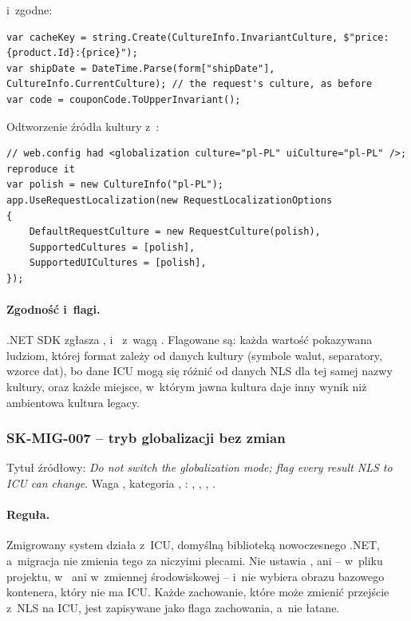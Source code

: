 i~zgodne:

\begin{lstlisting}
var cacheKey = string.Create(CultureInfo.InvariantCulture, $"price:{product.Id}:{price}");
var shipDate = DateTime.Parse(form["shipDate"], CultureInfo.CurrentCulture); // the request's culture, as before
var code = couponCode.ToUpperInvariant();
\end{lstlisting}

Odtworzenie źródła kultury z~:

\begin{lstlisting}
// web.config had <globalization culture="pl-PL" uiCulture="pl-PL" />; reproduce it
var polish = new CultureInfo("pl-PL");
app.UseRequestLocalization(new RequestLocalizationOptions
{
    DefaultRequestCulture = new RequestCulture(polish),
    SupportedCultures = [polish],
    SupportedUICultures = [polish],
});
\end{lstlisting}

\paragraph{Zgodność i~flagi.} .NET SDK zgłasza , 
i~ z~wagą . Flagowane są: każda wartość pokazywana ludziom,
której format zależy od danych kultury (symbole walut, separatory, wzorce dat), bo dane ICU
mogą się różnić od danych NLS dla tej samej nazwy kultury, oraz każde miejsce, w~którym
jawna kultura daje inny wynik niż ambientowa kultura legacy.


\subsubsection{SK-MIG-007 -- tryb globalizacji bez zmian}\label{sec:standardy-sk-mig-007}

Tytuł źródłowy: \emph{Do not switch the globalization mode; flag every result NLS to ICU can
change}. Waga , kategoria , :
, , , .

\paragraph{Reguła.} Zmigrowany system działa z~ICU, domyślną biblioteką nowoczesnego .NET,
a~migracja nie zmienia tego za niczyimi plecami. Nie ustawia
,  ani
 -- w~pliku projektu, w~
ani w~zmiennej środowiskowej -- i~nie wybiera obrazu bazowego kontenera, który nie ma ICU.
Każde zachowanie, które może zmienić przejście z~NLS na ICU, jest zapisywane jako flaga
zachowania, a~nie łatane.

